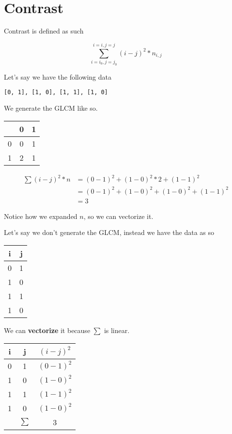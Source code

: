 \documentclass[article,oneside]{memoir}
\begin{document}
\section{Contrast}

Contrast is defined as such

$$\sum_{i=i_0,j=j_0}^{i=i,j=j}(i - j)^2*n_{i,j}$$

Let's say we have the following data

\begin{verbatim}
[0, 1], [1, 0], [1, 1], [1, 0]
\end{verbatim}

We generate the GLCM like so.

\begin{center}
\begin{tabular}{ |c|c|c| } 
 \hline   & 0 & 1\\ 
 \hline 0 & 0 & 1\\ 
 \hline 1 & 2 & 1\\ 
 \hline
\end{tabular}
\end{center} 

\begin{align*}
\sum(i - j)^2*n
&= (0 - 1) ^ 2 + (1 - 0) ^ 2 * 2 + (1 - 1) ^ 2\\
&= (0 - 1) ^ 2 + (1 - 0) ^ 2 + (1 - 0) ^ 2 + (1 - 1) ^ 2\\
&= 3
\end{align*}

Notice how we expanded $n$, so we can vectorize it.

Let's say we don't generate the GLCM, instead we have the data as so

\begin{center}
\begin{tabular}{ |c|c| } 
 \hline i & j\\ 
 \hline 0 & 1\\ 
 \hline 1 & 0\\
 \hline 1 & 1\\ 
 \hline 1 & 0\\ 
 \hline
\end{tabular}
\end{center} 

We can \textbf{vectorize} it because $\sum$ is linear.

\begin{center}
\begin{tabular}{ |c|c|c| } 
 \hline i & j & $(i-j)^2$ \\
 \hline 0 & 1 & $(0-1)^2$ \\
 \hline 1 & 0 & $(1-0)^2$ \\
 \hline 1 & 1 & $(1-1)^2$ \\
 \hline 1 & 0 & $(1-0)^2$ \\
 \hline
 \hline   & $\sum$ & 3 \\
 \hline
\end{tabular}
\end{center} 
\end{document}
